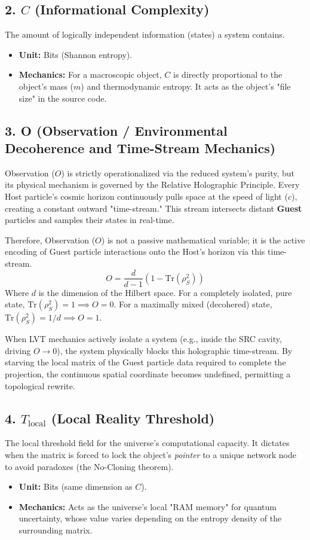 \documentclass[12pt,a4paper]{article}
\begin{document}
\subsection{2. $C$ (Informational Complexity)}
The amount of logically independent information (states) a system contains.
\begin{itemize}
    \item \textbf{Unit:} Bits (Shannon entropy).
    \item \textbf{Mechanics:} For a macroscopic object, $C$ is directly proportional to the object's mass ($m$) and thermodynamic entropy. It acts as the object's "file size" in the source code.
\end{itemize}

\subsection{3. O (Observation / Environmental Decoherence and Time-Stream Mechanics)}
Observation ($O$) is strictly operationalized via the reduced system's purity, but its physical mechanism is governed by the Relative Holographic Principle. Every Host particle's cosmic horizon continuously pulls space at the speed of light ($c$), creating a constant outward "time-stream." This stream intersects distant \textbf{Guest} particles and samples their states in real-time.

Therefore, Observation ($O$) is not a passive mathematical variable; it is the active encoding of Guest particle interactions onto the Host's horizon via this time-stream.
\begin{equation}\label{eq:O_decoherence}
O = \frac{d}{d-1} \left( 1 - \text{Tr}(\rho_S^2) \right)
\end{equation}
Where $d$ is the dimension of the Hilbert space. For a completely isolated, pure state, $\text{Tr}(\rho_S^2) = 1 \implies O = 0$. For a maximally mixed (decohered) state, $\text{Tr}(\rho_S^2) = 1/d \implies O = 1$.

When LVT mechanics actively isolate a system (e.g., inside the SRC cavity, driving $O \to 0$), the system physically blocks this holographic time-stream. By starving the local matrix of the Guest particle data required to complete the projection, the continuous spatial coordinate becomes undefined, permitting a topological rewrite.



\subsection{4. $T_{\mathrm{local}}$ (Local Reality Threshold)}
The local threshold field for the universe's computational capacity. It dictates when the matrix is forced to lock the object's \textit{pointer} to a unique network node to avoid paradoxes (the No-Cloning theorem).
\begin{itemize}
    \item \textbf{Unit:} Bits (same dimension as $C$).
    \item \textbf{Mechanics:} Acts as the universe's local "RAM memory" for quantum uncertainty, whose value varies depending on the entropy density of the surrounding matrix.
\end{itemize}
\end{document}
